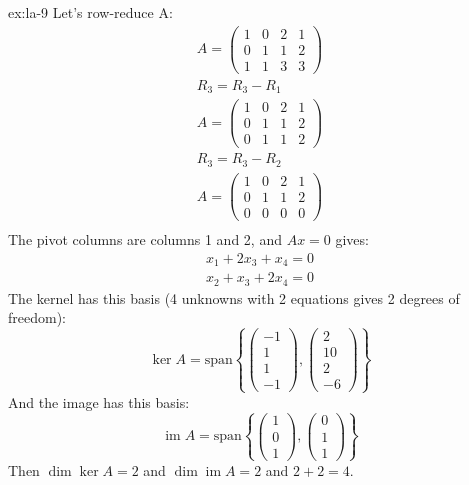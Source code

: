 \begin{solution}{ex:la-9}
  Let's row-reduce A:
  \[
    \begin{gathered}
      A=\begin{pmatrix}1&0&2&1\\0&1&1&2\\1&1&3&3\end{pmatrix}\\
      R_3=R_3-R_1\\
      A=\begin{pmatrix}1&0&2&1\\0&1&1&2\\0&1&1&2\end{pmatrix}\\
      R_3=R_3-R_2\\
      A=\begin{pmatrix}1&0&2&1\\0&1&1&2\\0&0&0&0\end{pmatrix}\\
    \end{gathered}
  \]
  The pivot columns are columns 1 and 2, and $Ax=0$ gives:
  \[
    \begin{gathered}
      x_1+2x_3+x_4=0\\
      x_2+x_3+2x_4=0
    \end{gathered}
  \]
  The kernel has this basis (4 unknowns with 2 equations gives 2 degrees of freedom):
  \[
    \ker A = \text{span}\left\{\begin{pmatrix}-1\\1\\1\\-1\end{pmatrix},\begin{pmatrix}2\\10\\2\\-6\end{pmatrix}\right\}
  \]
  And the image has this basis:
  \[
    \operatorname{im} A= \text{span}\left\{\begin{pmatrix}1\\0\\1\end{pmatrix},\begin{pmatrix}0\\1\\1\end{pmatrix}\right\}
  \]
  Then $\dim\ker A = 2$ and $\dim \operatorname{im}A = 2$ and $2+2=4$.
\end{solution}
